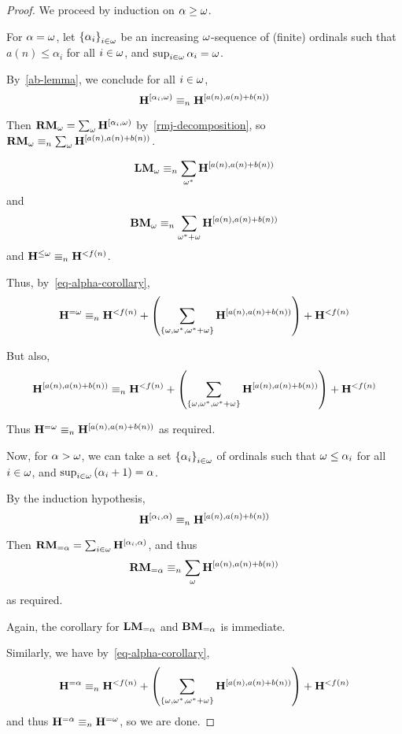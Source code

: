 \begin{proof}
    We proceed by induction on $\alpha \ge \omega$.

    For $\alpha = \omega$, let $\left\{ {\alpha_i} \right\}_{i \in \omega}$ be an increasing $\omega$-sequence of (finite) ordinals
    such that $a(n) \le \alpha_i$ for all $i \in \omega$, and $\sup_{i \in \omega} \alpha_i = \omega$.

    By~\cref{ab-lemma}, we conclude for all $i \in \omega$,
    \[
        \mathbf{H}^{[\alpha_i, \omega)} \equiv_n \mathbf{H}^{[a(n), a(n) + b(n))}
    \]

    Then $\mathbf{RM}_{\omega} = \sum_{\omega} \mathbf{H}^{[\alpha_i, \omega)}$
    by~\cref{rmj-decomposition},
    so $\mathbf{RM}_{\omega} \equiv_n \sum_{\omega} \mathbf{H}^{[a(n), a(n) + b(n))}$.

    \[
        \mathbf{LM}_{\omega} \equiv_n \sum_{\omega^\ast} \mathbf{H}^{[a(n), a(n) + b(n))}
    \]
    and
    \[
        \mathbf{BM}_{\omega} \equiv_n \sum_{\omega^\ast + \omega} \mathbf{H}^{[a(n), a(n) + b(n))}
    \]
    and $\mathbf{H}^{\le \omega} \equiv_n \mathbf{H}^{< f(n)}$.

    Thus, by~\cref{eq-alpha-corollary},
    \[
        \mathbf{H}^{= \omega}  \equiv_n \mathbf{H}^{< f(n)} +
        \left( {\sum_{\left\{ {\omega, \omega^\ast, \omega^\ast + \omega} \right\}} \mathbf{H}^{[a(n), a(n) + b(n))}} \right)
        + \mathbf{H}^{< f(n)}
    \]

    But also,
    \[
        \mathbf{H}^{[a(n), a(n) + b(n))} \equiv_n \mathbf{H}^{< f(n)}
        + \left( {\sum_{\left\{ {\omega, \omega^\ast, \omega^\ast + \omega} \right\}} \mathbf{H}^{[a(n), a(n) + b(n))}} \right)
        + \mathbf{H}^{< f(n)}
    \]

    Thus $\mathbf{H}^{= \omega} \equiv_n \mathbf{H}^{[a(n), a(n) + b(n))}$ as required.

    Now, for $\alpha > \omega$, we can take a set $\left\{ {\alpha_i} \right\}_{i \in \omega}$ of ordinals
    such that $\omega \le \alpha_i$ for all $i \in \omega$,
    and $\sup_{i \in \omega} \left( {\alpha_i + 1} \right) = \alpha$.

    By the induction hypothesis,
    \[
        \mathbf{H}^{[\alpha_i, \alpha)} \equiv_n \mathbf{H}^{[a(n), a(n) + b(n))}
    \]

    Then $\mathbf{RM}_{= \alpha} = \sum_{i \in \omega} \mathbf{H}^{[\alpha_i, \alpha)}$,
    and thus \[
        \mathbf{RM}_{= \alpha} \equiv_n \sum_{\omega} \mathbf{H}^{[a(n), a(n) + b(n))}
    \]
    as required.

    Again, the corollary for $\mathbf{LM}_{= \alpha}$ and $\mathbf{BM}_{= \alpha}$
    is immediate.

    Similarly, we have by~\cref{eq-alpha-corollary},
    \[
        \mathbf{H}^{= \alpha} \equiv_n \mathbf{H}^{< f(n)}
        + \left( {\sum_{\left\{ {\omega, \omega^\ast, \omega^\ast + \omega} \right\}} \mathbf{H}^{[a(n), a(n) + b(n))}} \right)
        + \mathbf{H}^{< f(n)}
    \]
    and thus $\mathbf{H}^{= \alpha} \equiv_n \mathbf{H}^{= \omega}$,
    so we are done.
\end{proof}
